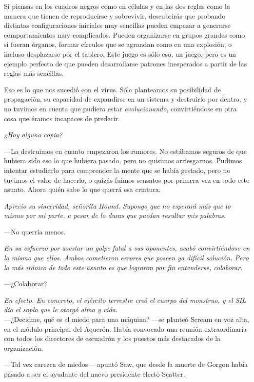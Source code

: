 \rquoti{}Si piensas en los cuadros negros como en células y en las dos reglas como la manera que tienen de reproducirse y sobrevivir, descubrirás que probando distintas configuraciones iniciales muy sencillas pueden empezar a generarse comportamientos muy complicados. Pueden organizarse en grupos grandes como si fueran órganos, formar círculos que se agrandan como en una explosión, o incluso desplazarse por el tablero. Este juego es sólo eso, un juego, pero es un ejemplo perfecto de que pueden desarrollarse patrones inesperados a partir de las reglas más sencillas.

\rquoti{}Eso es lo que nos sucedió con el virus. Sólo planteamos su posibilidad de propagación, su capacidad de expandirse en un sistema y destruirlo por dentro, y no tuvimos en cuenta que pudiera estar \emph{evolucionando}, convirtiéndose en otra cosa que éramos incapaces de predecir.

\emph{¿Hay alguna copia?}

---La destruimos en cuanto empezaron los rumores. No estábamos seguros de que hubiera sido eso lo que hubiera pasado, pero no quisimos arriesgarnos. Pudimos intentar estudiarlo para comprender la mente que se había gestado, pero no tuvimos el valor de hacerlo, o quizás fuimos sensatos por primera vez en todo este asunto. Ahora quién sabe lo que querrá esa criatura.

\emph{Aprecio su sinceridad, señorita Hound. Supongo que no esperará más que lo mismo por mi parte, a pesar de lo duras que puedan resultar mis palabras.}

---No querría menos.

\emph{En su esfuerzo por asestar un golpe fatal a sus oponentes, acabó convirtiéndose en lo mismo que ellos. Ambos cometieron errores que poseen ya difícil solución. Pero lo más irónico de todo este asunto es que lograron por fin entenderse, colaborar.}

---¿Colaborar?

\emph{En efecto. En concreto, el ejército terrestre creó el cuerpo del monstruo, y el SIL dio el soplo que le otorgó alma y vida.}\\

\noindent{}---¿Decidme, qué es el miedo para una máquina? ---se planteó Scream en voz alta, en el módulo principal del Aquerón. Había convocado una reunión extraordinaria con todos los directores de escuadrón y los puestos más destacados de la organización.

---Tal vez carezca de miedos ---apuntó Saw, que desde la muerte de Gorgon había pasado a ser el ayudante del nuevo presidente electo Scatter.

